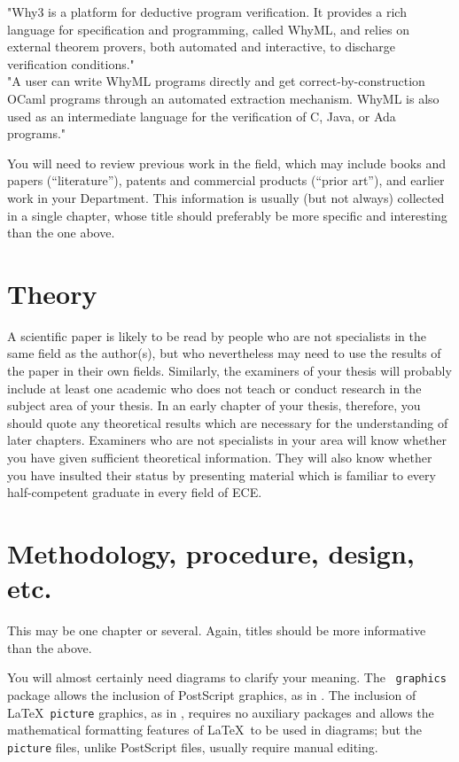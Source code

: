 \documentclass[12pt,openany,a4paper]{book}
\begin{document}
"Why3 is a platform for deductive program verification. It provides a rich language for
specification and programming, called WhyML, and relies on external theorem provers,
both automated and interactive, to discharge verification conditions."\\
"A user can write WhyML programs directly and get correct-by-construction
OCaml programs through an automated extraction mechanism. WhyML is also used as
an intermediate language for the verification of C, Java, or Ada programs."


You will need to review previous work in the field, which may include
books and papers (``literature''), patents and commercial products
(``prior art''), and earlier work in your Department.  This
information is usually (but not always) collected in a single chapter,
whose title should preferably be more specific and interesting than
the one above.

\chapter{Theory}

A scientific paper is likely to be read by people who are not
specialists in the same field as the author(s), but who nevertheless
may need to use the results of the paper in their own fields.
Similarly, the examiners of your thesis will probably include at least
one academic who does not teach or conduct research in the subject
area of your thesis.  In an early chapter of your thesis, therefore,
you should quote any theoretical results which are necessary for the
understanding of later chapters.  Examiners who are not specialists in
your area will know whether you have given sufficient theoretical
information.  They will also know whether you have insulted their
status by presenting material which is familiar to every
half-competent graduate in every field of ECE.

\chapter{Methodology, procedure, design, etc.}

This may be one chapter or several.  Again, titles should be more
informative than the above.

You will almost certainly need diagrams to clarify your meaning.  The
\LaTeXe\ \texttt{graphics} package allows the inclusion of PostScript
graphics, as in .  The inclusion of \LaTeX\ \texttt{picture}
graphics, as in , requires no auxiliary packages and allows
the mathematical formatting features of \LaTeX\ to be used in
diagrams; but the \texttt{picture} files, unlike PostScript files,
usually require manual editing.
\end{document}
